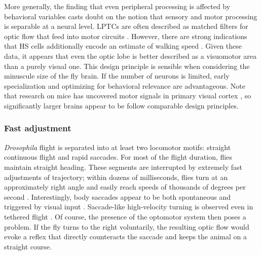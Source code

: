 More generally, the finding that even peripheral processing is affected by behavioral variables casts doubt on the notion that sensory and motor processing is separable at a neural level. LPTCs are often described as matched filters for optic flow that feed into motor circuits \citep{Krapp:1996}. However, there are strong indications that HS cells additionally encode an estimate of walking speed \citep{Fujiwara:2017aa}. Given these data, it appears that even the optic lobe is better described as a visuomotor area than a purely visual one. This design principle is sensible when considering the minuscule size of the fly brain. If the number of neurons is limited, early specialization and optimizing for behavioral relevance are advantageous. Note that research on mice has uncovered motor signals in primary visual cortex \citep{Keller:2012aa,Saleem:2013aa}, so significantly larger brains appear to be follow comparable design principles.

\subsubsection{Fast adjustment}
\textit{Drosophila} flight is separated into at least two locomotor motifs: straight continuous flight and rapid saccades. For most of the flight duration, flies maintain straight heading. These segments are interrupted by extremely fast adjustments of trajectory; within dozens of milliseconds, flies turn at an approximately right angle and easily reach speeds of thousands of degrees per second \citep{Mronz:2008eb,Straw:2011eua,Muijres:2014aa}. Interestingly, body saccades appear to be both spontaneous and triggered by visual input \citep{Tammero:2002aa,Mronz:2008eb,Censi:2013cya}. Saccade-like high-velocity turning is observed even in tethered flight \citep{Gotz:1968aa}. Of course, the presence of the optomotor system then poses a problem. If the fly turns to the right voluntarily, the resulting optic flow would evoke a reflex that directly counteracts the saccade and keeps the animal on a straight course.

